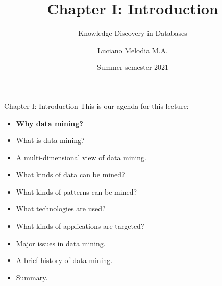 \documentclass[aspectratio=169,t]{beamer}
\title[KDD]{Chapter I: Introduction}
\subtitle{Knowledge Discovery in Databases}
\author[L.~Melodia]{Luciano Melodia M.A.}
\institute[Department]{Evolutionary Data Management, Friedrich-Alexander University Erlangen-Nürnberg}
\date{Summer semester 2021}
\begin{document}
  \maketitle

  { 
    \begin{frame}{Chapter I: Introduction}
    This is our agenda for this lecture:
        \begin{itemize}
            \item \textbf{Why data mining?}
            \item What is data mining?
            \item A multi-dimensional view of data mining.
            \item What kinds of data can be mined?
            \item What kinds of patterns can be mined?
            \item What technologies are used?
            \item What kinds of applications are targeted?
            \item Major issues in data mining.
            \item A brief history of data mining.
            \item Summary.
        \end{itemize}
    \end{frame}
  }
\end{document}
